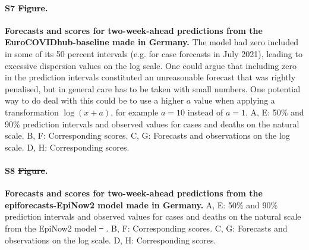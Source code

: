 \documentclass[10pt,letterpaper]{article} %
\providecommand{\DIFaddtex}[1]{{\protect\color{blue}\uwave{#1}}} %
\providecommand{\DIFdeltex}[1]{{\protect\color{red}\sout{#1}}}                      %
\providecommand{\DIFaddbegin}{} %
\providecommand{\DIFaddend}{} %
\providecommand{\DIFdelbegin}{} %
\providecommand{\DIFdelend}{} %
\providecommand{\DIFadd}[1]{\texorpdfstring{\DIFaddtex{#1}}{#1}} %
\providecommand{\DIFdel}[1]{\texorpdfstring{\DIFdeltex{#1}}{}} %
\newcommand{\DIFscaledelfig}{0.5}
\newlength{\DIFdelgraphicswidth} %
\newlength{\DIFdelgraphicsheight} %
\newcommand{\DIFaddincludegraphics}[2][]{{\color{blue}\fbox{\DIFOincludegraphics[#1]{#2}}}} %
\newcommand{\DIFdelincludegraphics}[2][]{%
\sbox{\DIFdelgraphicsbox}{\DIFOincludegraphics[#1]{#2}}%
\settoboxwidth{\DIFdelgraphicswidth}{\DIFdelgraphicsbox} %
\settoboxtotalheight{\DIFdelgraphicsheight}{\DIFdelgraphicsbox} %
\scalebox{\DIFscaledelfig}{%
\parbox[b]{\DIFdelgraphicswidth}{\usebox{\DIFdelgraphicsbox}\\[-\baselineskip] \rule{\DIFdelgraphicswidth}{0em}}\llap{\resizebox{\DIFdelgraphicswidth}{\DIFdelgraphicsheight}{%
\setlength{\unitlength}{\DIFdelgraphicswidth}%
\begin{picture}(1,1)%
\thicklines\linethickness{2pt} %
{\color[rgb]{1,0,0}\put(0,0){\framebox(1,1){}}}%
{\color[rgb]{1,0,0}\put(0,0){\line( 1,1){1}}}%
{\color[rgb]{1,0,0}\put(0,1){\line(1,-1){1}}}%
\end{picture}%
}\hspace*{3pt}}} %
} %
\DeclareRobustCommand{\DIFaddbegin}{\DIFOaddbegin \let\includegraphics\DIFaddincludegraphics} %
\DeclareRobustCommand{\DIFaddend}{\DIFOaddend \let\includegraphics\DIFOincludegraphics} %
\DeclareRobustCommand{\DIFdelbegin}{\DIFOdelbegin \let\includegraphics\DIFdelincludegraphics} %
\DeclareRobustCommand{\DIFdelend}{\DIFOaddend \let\includegraphics\DIFOincludegraphics} %
\begin{document}
\paragraph{S7 \DIFdelbegin \DIFdel{Figure}\DIFdelend \DIFaddbegin \DIFadd{Fig}\DIFaddend .}
\label{fig:HUB-model-comparison-baseline}
\textbf{Forecasts and scores for two-week-ahead predictions from the EuroCOVIDhub-baseline made in Germany. }
The model had zero included in some of its 50 percent intervals (e.g. for case forecasts in July 2021), leading to excessive dispersion values on the log scale. One could argue that including zero in the prediction intervals constituted an unreasonable forecast that was rightly penalised, but in general care has to be taken with small numbers. One potential way to do deal with this could be to use a higher $a$ value when applying a transformation $\log(x + a)$, for example $a = 10$ instead of $a = 1$. A, E: 50\% and 90\% prediction intervals and observed values for cases and deaths on the natural scale. B, F: Corresponding scores. C, G: Forecasts and observations on the log scale. D, H: Corresponding scores. 

\paragraph{S8 \DIFdelbegin \DIFdel{Figure}\DIFdelend \DIFaddbegin \DIFadd{Fig}\DIFaddend .}
\label{fig:HUB-model-comparison-epinow}
\textbf{Forecasts and scores for two-week-ahead predictions from the epiforecasts-EpiNow2 model made in Germany.} 
A, E: 50\% and 90\% prediction intervals and observed values for cases and deaths on the natural scale from the EpiNow2 model \DIFdelbegin \DIFdel{\mbox{%
\citep{epinow2}}\hskip0pt%
}\DIFdelend \DIFaddbegin \DIFadd{\mbox{%
\cite{epinow2}}\hskip0pt%
}\DIFaddend . B, F: Corresponding scores. C, G: Forecasts and observations on the log scale. D, H: Corresponding scores. 


\clearpage

 \DIFdelbegin %

\DIFdelend
\end{document}
